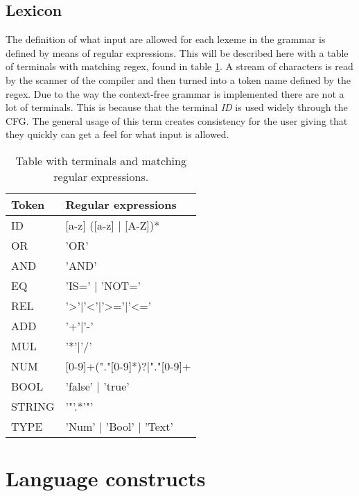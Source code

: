 \subsection{Lexicon}
The definition of what input are allowed for each lexeme in the grammar is defined by means of regular expressions. This will be described here with a table of terminals with matching regex, found in table \ref{fig:Lexicon}. A stream of characters is read by the scanner of the compiler and then turned into a token name defined by the regex.
Due to the way the context-free grammar is implemented there are not a lot of terminals. This is because that the terminal \emph{ID} is used widely through the CFG. The general usage of this term creates consistency for the user giving that they quickly can get a feel for what input is allowed. 

\begin{table}[]
\centering
\begin{tabular}{|l|l|}
\hline
Token & Regular expressions                \\ \hline
ID       & {[}a-z{]} ({[}a-z{]} | {[}A-Z{]})* \\ \hline
OR		 & 'OR'								  \\ \hline
AND		 & 'AND'							  \\ \hline
EQ		 & 'IS=' | 'NOT='					  \\ \hline
REL		 & '>'|'<'|'>='|'<='					  \\ \hline
ADD		 & '+'|'-'							  \\ \hline
MUL		 & '*'|'/'							  \\ \hline
NUM		 & [0-9]+("."[0-9]*)?|"."[0-9]+\\ \hline
BOOL 	 & 'false' | 'true'					  \\ \hline
STRING 	 & '"'.*'"'						      \\ \hline
TYPE     & 'Num' | 'Bool' | 'Text'            \\ \hline


\end{tabular}
\caption{Table with terminals and matching regular expressions.}
\label{fig:Lexicon}
\end{table}

\section{Language constructs}

